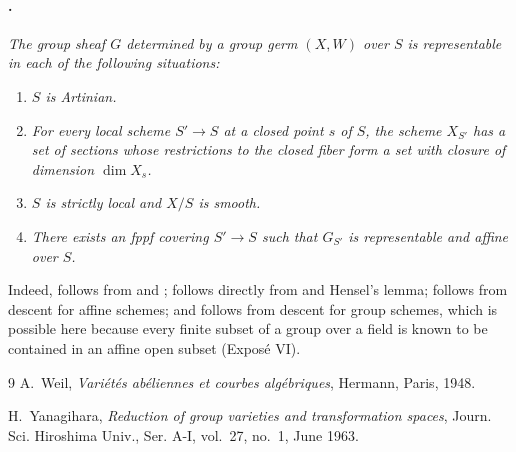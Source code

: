 \paragraph{.}
\textit{The group sheaf \(G\) determined by a group germ
\((X,W)\) over \(S\) is representable in each of the following
situations:}
\begingroup
\renewcommand{\labelenumi}{\textup{(\roman{enumi})}}
\begin{enumerate}
\item \textit{\(S\) is Artinian.}
\item \textit{For every local scheme \(S'\to S\) at a closed
point \(s\) of \(S\), the scheme \(X_{S'}\) has a set of sections
whose restrictions to the closed fiber form a set with closure
of dimension \(\dim X_s\).}
\item{} \textit{\(S\) is strictly local and \(X/S\) is smooth.}
\item \textit{There exists an fppf covering \(S'\to S\) such
that \(G_{S'}\) is representable and affine over \(S\).}
\end{enumerate}
\endgroup

Indeed,  follows from  and ;  follows
directly from  and Hensel's lemma;  follows from descent
for affine schemes; and  follows from descent for group
schemes, which is possible here because every finite subset of a
group over a field is known to be contained in an affine open
subset (Exposé VI).

\begin{thebibliography}{9}
A.~Weil,
\emph{Variétés abéliennes et courbes algébriques},
Hermann, Paris, 1948.

H.~Yanagihara,
\emph{Reduction of group varieties and transformation spaces},
Journ. Sci. Hiroshima Univ., Ser. A-I, vol.~27, no.~1,
June 1963.
\end{thebibliography}



